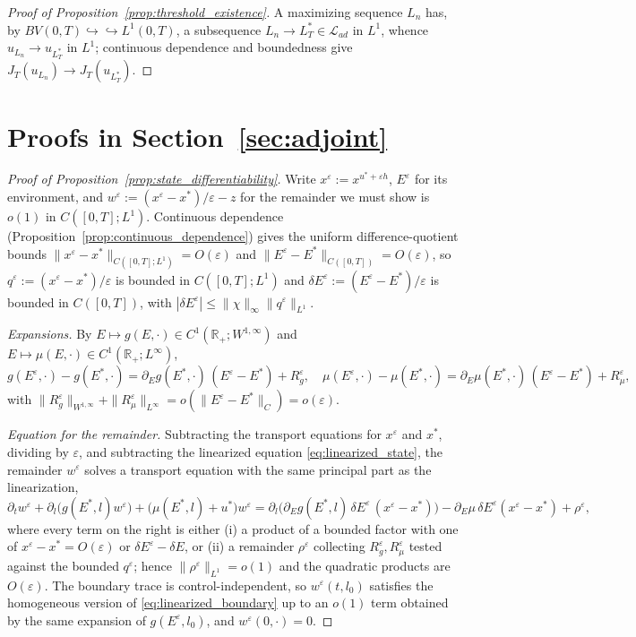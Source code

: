 \documentclass[pdflatex,sn-mathphys-num]{sn-jnl}
\newcommand{\R}{\mathbb{R}}
\theoremstyle{plain}
\theoremstyle{definition}
\theoremstyle{remark}
\begin{document}
\begin{proof}[Proof of Proposition~\ref{prop:threshold_existence}]
A maximizing sequence $L_n$ has, by $BV(0,T)\hookrightarrow\hookrightarrow
L^1(0,T)$, a subsequence $L_n\to L_T^*\in\mathcal L_{ad}$ in $L^1$, whence
$u_{L_n}\to u_{L_T^*}$ in $L^1$; continuous dependence and boundedness give
$J_T(u_{L_n})\to J_T(u_{L_T^*})$.
\end{proof}

\section{Proofs in Section~\ref{sec:adjoint}}

\begin{proof}[Proof of Proposition~\ref{prop:state_differentiability}]
Write $x^\varepsilon:=x^{u^*+\varepsilon h}$, $E^\varepsilon$ for its environment,
and $w^\varepsilon:=(x^\varepsilon-x^*)/\varepsilon-z$ for the remainder we must
show is $o(1)$ in $C([0,T];L^1)$. Continuous dependence
(Proposition~\ref{prop:continuous_dependence}) gives the uniform difference-quotient
bounds $\|x^\varepsilon-x^*\|_{C([0,T];L^1)}=O(\varepsilon)$ and
$\|E^\varepsilon-E^*\|_{C([0,T])}=O(\varepsilon)$, so
$q^\varepsilon:=(x^\varepsilon-x^*)/\varepsilon$ is bounded in $C([0,T];L^1)$ and
$\delta E^\varepsilon:=(E^\varepsilon-E^*)/\varepsilon$ is bounded in $C([0,T])$,
with $|\delta E^\varepsilon|\le\|\chi\|_\infty\|q^\varepsilon\|_{L^1}$.

\emph{Expansions.} By $E\mapsto g(E,\cdot)\in C^1(\R_+;W^{1,\infty})$ and
$E\mapsto\mu(E,\cdot)\in C^1(\R_+;L^\infty)$,
\[
g(E^\varepsilon,\cdot)-g(E^*,\cdot)=\partial_Eg(E^*,\cdot)\,(E^\varepsilon-E^*)+R_g^\varepsilon,
\quad
\mu(E^\varepsilon,\cdot)-\mu(E^*,\cdot)=\partial_E\mu(E^*,\cdot)\,(E^\varepsilon-E^*)+R_\mu^\varepsilon,
\]
with $\|R_g^\varepsilon\|_{W^{1,\infty}}+\|R_\mu^\varepsilon\|_{L^\infty}
=o(\|E^\varepsilon-E^*\|_C)=o(\varepsilon)$.

\emph{Equation for the remainder.} Subtracting the transport equations for
$x^\varepsilon$ and $x^*$, dividing by $\varepsilon$, and subtracting the
linearized equation \eqref{eq:linearized_state}, the remainder $w^\varepsilon$
solves a transport equation with the same principal part as the linearization,
\[
\partial_t w^\varepsilon+\partial_l\!\big(g(E^*,l)w^\varepsilon\big)
+\big(\mu(E^*,l)+u^*\big)w^\varepsilon
=\partial_l\!\big(\partial_Eg(E^*,l)\,\delta E^\varepsilon\,(x^\varepsilon-x^*)\big)
-\partial_E\mu\,\delta E^\varepsilon (x^\varepsilon-x^*)+\rho^\varepsilon,
\]
where every term on the right is either (i) a product of a bounded factor with one
of $x^\varepsilon-x^*=O(\varepsilon)$ or $\delta E^\varepsilon-\delta E$, or (ii) a
remainder $\rho^\varepsilon$ collecting $R_g^\varepsilon,R_\mu^\varepsilon$ tested
against the bounded $q^\varepsilon$; hence
$\|\rho^\varepsilon\|_{L^1}=o(1)$ and the quadratic products are $O(\varepsilon)$.
The boundary trace is control-independent, so $w^\varepsilon(t,l_0)$ satisfies the
homogeneous version of \eqref{eq:linearized_boundary} up to an $o(1)$ term obtained
by the same expansion of $g(E^\varepsilon,l_0)$, and $w^\varepsilon(0,\cdot)=0$.


\end{proof}
\end{document}
